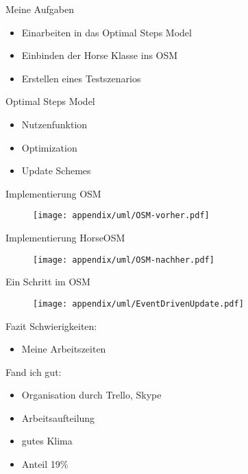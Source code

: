 \begin{frame}{Meine Aufgaben}
	\begin{itemize}
		\item Einarbeiten in das Optimal Steps Model
		\item Einbinden der Horse Klasse ins OSM
		\item Erstellen eines Testszenarios 
	\end{itemize}
\end{frame}

\begin{frame}{Optimal Steps Model}
	\begin{itemize}
		\item Nutzenfunktion
		\item Optimization
		\item Update Schemes
	\end{itemize}
\end{frame}

\begin{frame}{Implementierung OSM}
	\begin{figure}
		\texttt{[image: appendix/uml/OSM-vorher.pdf]}
	\end{figure}
\end{frame}

\begin{frame}{Implementierung HorseOSM}
	\begin{figure}
		\texttt{[image: appendix/uml/OSM-nachher.pdf]}
	\end{figure}
\end{frame}

\begin{frame}{Ein Schritt im OSM}
	\begin{figure}
		\texttt{[image: appendix/uml/EventDrivenUpdate.pdf]}
	\end{figure}
\end{frame}

\begin{frame}{Fazit}
	Schwierigkeiten:
	\begin{itemize}
		\item Meine Arbeitszeiten
	\end{itemize}
	Fand ich gut:
	\begin{itemize}
		\item Organisation durch Trello, Skype
		\item Arbeitsaufteilung
		\item gutes Klima
		\item Anteil 19\%
	\end{itemize}
\end{frame}